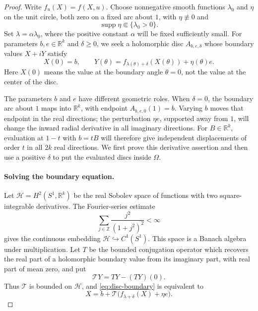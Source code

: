 \begin{proof}
Write $f_u(X)=f(X,u)$.  Choose nonnegative smooth functions $\lambda_0$ and $\eta$ on the unit circle, both zero on a fixed arc about $1$, with $\eta\not\equiv0$ and
\[
 \operatorname{supp}\eta\Subset\{\lambda_0>0\}.
\]
Set $\lambda=\alpha\lambda_0$, where the positive constant $\alpha$ will be fixed sufficiently small.  For parameters $b,e\in\mathbb{R}^k$ and $\delta\ge0$, we seek a holomorphic disc $A_{b,e,\delta}$ whose boundary values $X+iY$ satisfy
\begin{equation}\label{eq:disc-boundary}
 X(0)=b,
 \qquad
 Y(\theta)=f_{\lambda(\theta)+\delta}(X(\theta))+
             \eta(\theta)e.
\end{equation}
Here $X(0)$ means the value at the boundary angle $\theta=0$, not the value at the center of the disc.

The parameters $b$ and $e$ have different geometric roles.  When $\delta=0$, the boundary arc about $1$ maps into $\mathbb{R}^k$, with endpoint $A_{b,e,0}(1)=b$.  Varying $b$ moves that endpoint in the real directions; the perturbation $\eta e$, supported away from $1$, will change the inward radial derivative in all imaginary directions.  For $B\in\mathbb{R}^k$, evaluation at $1-t$ with $b=tB$ will therefore give independent displacements of order $t$ in all $2k$ real directions.  We first prove this derivative assertion and then use a positive $\delta$ to put the evaluated discs inside $\Omega$.

\paragraph{Solving the boundary equation.}
Let $\mathcal{H}=H^2(S^1,\mathbb{R}^k)$ be the real Sobolev space of functions with two square-integrable derivatives.  The Fourier-series estimate
\[
 \sum_{j\in\mathbb{Z}}\frac{j^2}{(1+j^2)^2}<\infty
\]
gives the continuous embedding $\mathcal{H}\hookrightarrow C^1(S^1)$. This space is a Banach algebra under multiplication.  Let $T$ be the bounded conjugation operator which recovers the real part of a holomorphic boundary value from its imaginary part, with real part of mean zero, and put
\[
 \mathcal{T} Y=TY-(TY)(0).
\]
Thus $\mathcal{T}$ is bounded on $\mathcal{H}$, and \eqref{eq:disc-boundary} is equivalent to
\begin{equation}\label{eq:disc-contraction}
 X=b+\mathcal{T}\bigl(f_{\lambda+\delta}(X)+\eta e\bigr).
\end{equation}


\end{proof}
